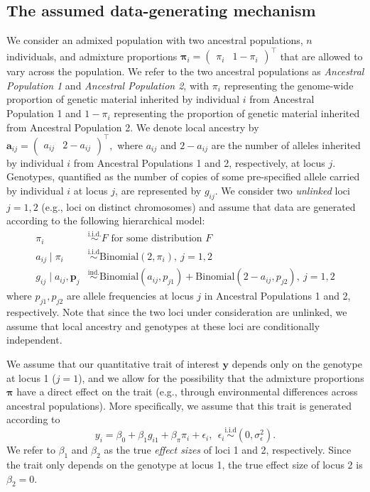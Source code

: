 \documentclass[12pt]{article}
\begin{document}
\subsection{The assumed data-generating mechanism}

We consider an admixed population with two ancestral populations, $n$ individuals, and admixture proportions $\boldsymbol{\pi}_i = \begin{pmatrix} \pi_{i} & 1-\pi_{i} \end{pmatrix}^\top$ that are allowed to vary across the population. 
We refer to the two ancestral populations as \textit{Ancestral Population 1} and \textit{Ancestral Population 2}, with $\pi_i$ representing the genome-wide proportion of genetic material inherited by individual $i$ from Ancestral Population 1 and $1-\pi_i$ representing the proportion of genetic material inherited from Ancestral Population 2. 
We denote local ancestry by $\mathbf{a}_{ij} = \begin{pmatrix} a_{ij} & 2 - a_{ij} \end{pmatrix}^\top,$ where $a_{ij}$ and $2-a_{ij}$ are the number of alleles inherited by individual $i$ from Ancestral Populations 1 and 2, respectively, at locus $j$.
Genotypes, quantified as the number of copies of some pre-specified allele carried by individual $i$ at locus $j$, are represented by $g_{ij}$.
We consider two \textit{unlinked} loci $j = 1, 2$ (e.g., loci on distinct chromosomes) and assume that data are generated according to the following hierarchical model: 
\begin{align*}
\pi_i &\overset{\text{i.i.d.}}{\sim} F \text{ for some distribution } F\\
a_{ij} \mid \pi_i &\overset{\text{i.i.d}}{\sim} \text{Binomial}(2, \pi_i), \ j = 1, 2\\
g_{ij} \mid a_{ij}, \mathbf{p}_j &\overset{\text{ind.}}{\sim} \text{Binomial}(a_{ij}, p_{j1}) + \text{Binomial}(2-a_{ij}, p_{j2}), \ j = 1, 2 
\end{align*}
where $p_{j1}, p_{j2}$ are allele frequencies at locus $j$ in Ancestral Populations 1 and 2, respectively. Note that since the two loci under consideration are unlinked, we assume that local ancestry and genotypes at these loci are conditionally independent.

We assume that our quantitative trait of interest $\mathbf{y}$ depends only on the genotype at locus 1 ($j = 1$), and we allow for the possibility that the admixture proportions $\boldsymbol\pi$ have a direct effect on the trait (e.g., through environmental differences across ancestral populations). More specifically, we assume that this trait is generated according to $$y_i  = \beta_0 + \beta_1 g_{i1} + \beta_\pi \pi_i + \epsilon_i, \ \ \epsilon_i \overset{\text{i.i.d}}{\sim} (0, \sigma_\epsilon^2).$$
We refer to $\beta_1$ and $\beta_2$ as the true \textit{effect sizes} of loci 1 and 2, respectively. Since the trait only depends on the genotype at locus 1, the true effect size of locus 2 is $\beta_2 = 0$.
\end{document}
